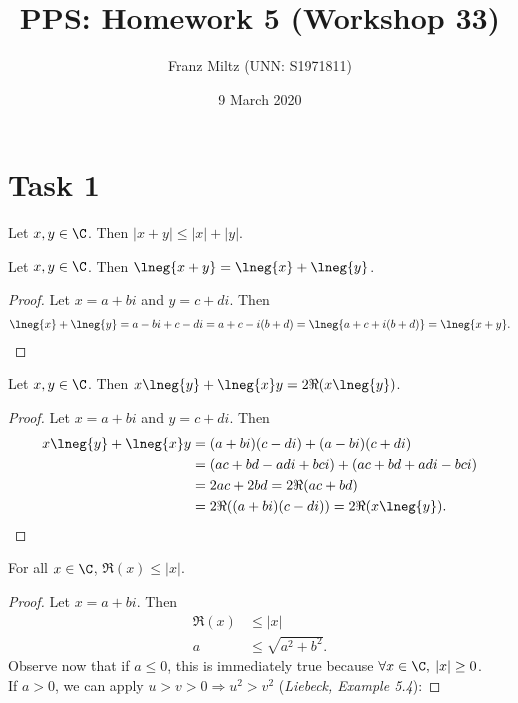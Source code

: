 \documentclass{article}
\title{PPS: Homework 5 (Workshop 33)}
\author{Franz Miltz (UNN: S1971811)}
\date{9 March 2020}
\begin{document}
\maketitle
\section*{Task 1}
\begin{claim}
  Let $x,y\in\C$. Then $|x+y|\leq |x|+|y|$.
\end{claim}
\begin{adjustwidth}{2em}{0pt}
  \begin{lemma}
    \label{l1}
    Let $x,y\in\C$. Then $\lneg{x+y}=\lneg{x}+\lneg{y}$.
  \end{lemma}
  \begin{proof}
    Let $x=a+bi$ and $y=c+di$. Then
    \begin{align*}
      \lneg{x}+\lneg{y}=a-bi+c-di=a+c-i(b+d)=\lneg{a+c+i(b+d)}=\lneg{x+y}.
    \end{align*}
  \end{proof}
  \begin{lemma}
    \label{l2}
    Let $x,y\in\C$. Then $x\lneg{y}+\lneg{x}y=2\Re({x\lneg{y}})$.
  \end{lemma}
  \begin{proof}
    Let $x=a+bi$ and $y=c+di$. Then
    \begin{align*}
      x\lneg{y}+\lneg{x}y & =(a+bi)(c-di)+(a-bi)(c+di)           \\
                          & =(ac+bd-adi+bci)+(ac+bd+adi-bci)     \\
                          & =2ac+2bd=2\Re(ac+bd)                 \\
                          & =2\Re((a+bi)(c-di))=2\Re(x\lneg{y}).
    \end{align*}
  \end{proof}
  \begin{lemma}
    \label{l3}
    For all $x\in\C$, $\Re(x)\leq|x|$.
  \end{lemma}
  \begin{proof}
    Let $x=a+bi$. Then
    \begin{align*}
      \Re(x) & \leq|x|              \\
      a      & \leq \sqrt{a^2+b^2}.
    \end{align*}
    Observe now that if $a\leq0$, this is immediately true because $\forall x\in\C,\:|x|\geq 0$.\\
    If $a>0$, we can apply $u>v>0\Rightarrow u^2>v^2$ (\emph{Liebeck, Example 5.4}):

\end{proof}
\end{adjustwidth}
\end{document}
